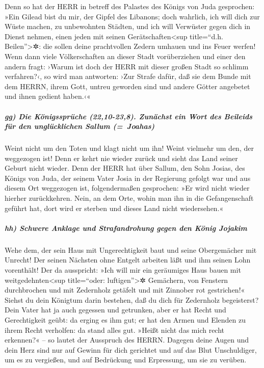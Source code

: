 Denn so hat der HERR in betreff des Palastes des Königs
von Juda gesprochen: »Ein Gilead bist du mir, der Gipfel des Libanons;
doch wahrlich, ich will dich zur Wüste machen, zu unbewohnten Städten,
und ich will Verwüster gegen dich in Dienst nehmen, einen
jeden mit seinen Gerätschaften\textless sup title=``d.h.
Beilen''\textgreater✲: die sollen deine prachtvollen Zedern umhauen und
ins Feuer werfen! Wenn dann viele Völkerschaften an dieser
Stadt vorüberziehen und einer den andern fragt: ›Warum ist doch der HERR
mit dieser großen Stadt so schlimm verfahren?‹, so wird
man antworten: ›Zur Strafe dafür, daß sie dem Bunde mit dem HERRN, ihrem
Gott, untreu geworden sind und andere Götter angebetet und ihnen gedient
haben.‹«

\hypertarget{gg-die-kuxf6nigsspruxfcche-2210-238.-zunuxe4chst-ein-wort-des-beileids-fuxfcr-den-ungluxfccklichen-sallum-joahas}{%
\subparagraph{gg) Die Königssprüche (22,10-23,8). Zunächst ein Wort des
Beileids für den unglücklichen Sallum
(=~Joahas)}\label{gg-die-kuxf6nigsspruxfcche-2210-238.-zunuxe4chst-ein-wort-des-beileids-fuxfcr-den-ungluxfccklichen-sallum-joahas}}

Weint nicht um den Toten und klagt nicht um ihn! Weint
vielmehr um den, der weggezogen ist! Denn er kehrt nie wieder zurück und
sieht das Land seiner Geburt nicht wieder. Denn der HERR
hat über Sallum, den Sohn Josias, des Königs von Juda, der seinem Vater
Josia in der Regierung gefolgt war und aus diesem Ort weggezogen ist,
folgendermaßen gesprochen: »Er wird nicht wieder hierher zurückkehren.
Nein, an dem Orte, wohin man ihn in die Gefangenschaft
geführt hat, dort wird er sterben und dieses Land nicht wiedersehen.«

\hypertarget{hh-schwere-anklage-und-strafandrohung-gegen-den-kuxf6nig-jojakim}{%
\subparagraph{hh) Schwere Anklage und Strafandrohung gegen den König
Jojakim}\label{hh-schwere-anklage-und-strafandrohung-gegen-den-kuxf6nig-jojakim}}

Wehe dem, der sein Haus mit Ungerechtigkeit baut und
seine Obergemächer mit Unrecht! Der seinen Nächsten ohne Entgelt
arbeiten läßt und ihm seinen Lohn vorenthält! Der da
ausspricht: »Ich will mir ein geräumiges Haus bauen mit
weitgedehnten\textless sup title=``oder: luftigen''\textgreater✲
Gemächern, von Fenstern durchbrochen und mit Zedernholz getäfelt und mit
Zinnober rot gestrichen!« Siehst du dein Königtum darin
bestehen, daß du dich für Zedernholz begeisterst? Dein Vater hat ja auch
gegessen und getrunken, aber er hat Recht und Gerechtigkeit geübt: da
erging es ihm gut; er hat den Armen und Elenden zu ihrem
Recht verholfen: da stand alles gut. »Heißt nicht das mich recht
erkennen?« -- so lautet der Ausspruch des HERRN. Dagegen
deine Augen und dein Herz sind nur auf Gewinn für dich gerichtet und auf
das Blut Unschuldiger, um es zu vergießen, und auf Bedrückung und
Erpressung, um sie zu verüben.

